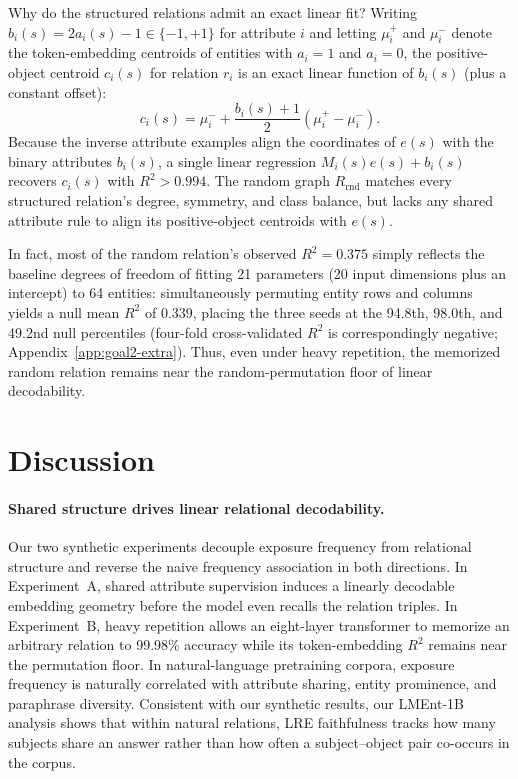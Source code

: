 \documentclass[11pt]{article}
\newcommand{\Rrnd}{R_{\mathrm{rnd}}}
\newcommand{\ExpTwoRandomRsq}{0.375}
\newcommand{\ExpTwoNullMean}{0.339}
\begin{document}
Why do the structured relations admit an exact linear fit? Writing
$b_i(s)=2a_i(s)-1\in\{-1,+1\}$ for attribute $i$ and letting $\mu_i^+$ and
$\mu_i^-$ denote the token-embedding centroids of entities with $a_i=1$ and
$a_i=0$, the positive-object centroid $ c_i(s)$ for relation $r_i$ is an exact linear
function of $b_i(s)$ (plus a constant offset):
\begin{equation}
  c_i(s)=\mu_i^-+\frac{b_i(s)+1}{2}(\mu_i^+-\mu_i^-).
  \label{eq:structured-affine}
\end{equation}
Because the inverse attribute examples align the coordinates of $e(s)$ with the
binary attributes $b_i(s)$, a single linear regression $M_i(s)e(s)+b_i(s)$ recovers
$c_i(s)$ with $R^2 > 0.994$. The random graph $\Rrnd$ matches every structured
relation's degree, symmetry, and class balance, but lacks any shared attribute
rule to align its positive-object centroids with $e(s)$.

In fact, most of the random relation's observed $R^2=\ExpTwoRandomRsq{}$ simply
reflects the baseline degrees of freedom of fitting 21 parameters (20 input
dimensions plus an intercept) to 64 entities: simultaneously permuting entity
rows and columns yields a null mean $R^2$ of $\ExpTwoNullMean{}$, placing the
three seeds at the 94.8th, 98.0th, and 49.2nd null percentiles (four-fold
cross-validated $R^2$ is correspondingly negative;
Appendix~\ref{app:goal2-extra}). Thus, even under heavy repetition, the
memorized random relation remains near the random-permutation floor of linear
decodability.




\section{Discussion}

\paragraph{Shared structure drives linear relational decodability.}
Our two synthetic experiments decouple exposure frequency from relational
structure and reverse the naive frequency association in both directions. In
Experiment~A, shared attribute supervision induces a linearly decodable
embedding geometry before the model even recalls the relation triples. In
Experiment~B, heavy repetition allows an eight-layer transformer to memorize an
arbitrary relation to 99.98\% accuracy while its token-embedding $R^2$ remains
near the permutation floor. In natural-language pretraining corpora, exposure
frequency is naturally correlated with attribute sharing, entity prominence, and
paraphrase diversity. Consistent with our synthetic results, our LMEnt-1B
analysis shows that within natural relations, LRE faithfulness tracks how many
subjects share an answer rather than how often a subject--object pair co-occurs
in the corpus.
\end{document}
